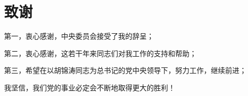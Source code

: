 \titleformat{\chapter}{\centering\xiaosan\hei}{\chaptername}{2em}{} %




\chapter*{致\qquad 谢}

第一，衷心感谢，中央委员会接受了我的辞呈；

第二，衷心感谢，这若干年来同志们对我工作的支持和帮助；

第三，希望在以胡锦涛同志为总书记的党中央领导下，努力工作，继续前进；

我坚信，我们党的事业必定会不断地取得更大的胜利！

\clearpage